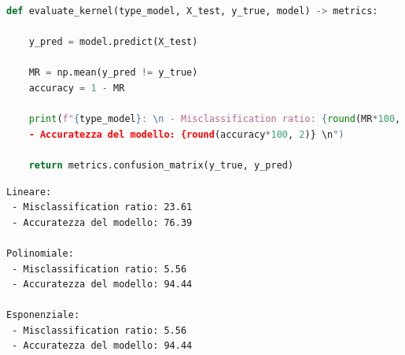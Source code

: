 \documentclass{article}
\begin{document}
    \begin{lstlisting}[language=Python]
def evaluate_kernel(type_model, X_test, y_true, model) -> metrics:

    y_pred = model.predict(X_test)

    MR = np.mean(y_pred != y_true)
    accuracy = 1 - MR

    print(f"{type_model}: \n - Misclassification ratio: {round(MR*100, 2)} \n 
    - Accuratezza del modello: {round(accuracy*100, 2)} \n")
    
    return metrics.confusion_matrix(y_true, y_pred)
    \end{lstlisting}
    \begin{lstlisting}[style=Jupyter]
Lineare: 
 - Misclassification ratio: 23.61 
 - Accuratezza del modello: 76.39 

Polinomiale: 
 - Misclassification ratio: 5.56 
 - Accuratezza del modello: 94.44 

Esponenziale: 
 - Misclassification ratio: 5.56 
 - Accuratezza del modello: 94.44 
    \end{lstlisting}
    
    \newpage
\end{document}
